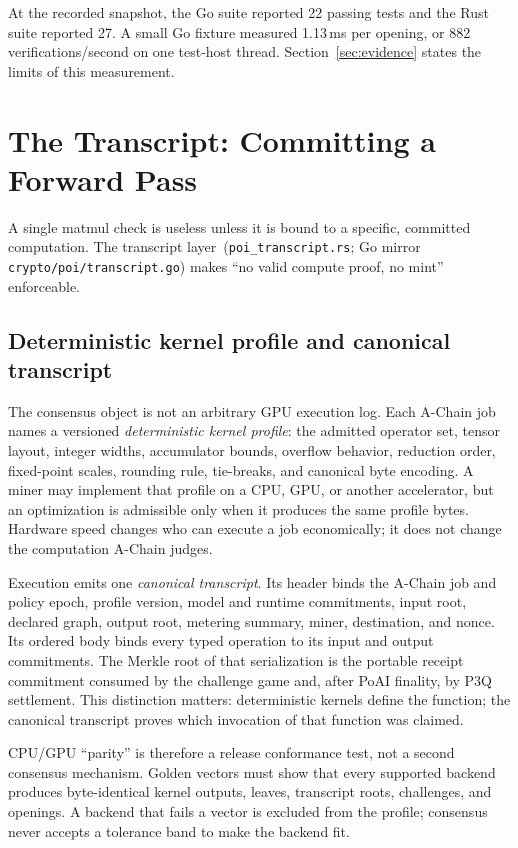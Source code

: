 \documentclass[11pt,a4paper]{article}
\begin{document}
At the recorded snapshot, the Go suite reported 22 passing tests and the Rust suite reported 27. A small Go fixture measured 1.13\,ms per opening, or 882 verifications/second on one test-host thread. Section~\ref{sec:evidence} states the limits of this measurement.

\section{The Transcript: Committing a Forward Pass}\label{sec:transcript}

A single matmul check is useless unless it is bound to a specific, committed computation. The transcript layer~(\texttt{poi\_transcript.rs}; Go mirror \texttt{crypto/poi/transcript.go}) makes ``no valid compute proof, no mint'' enforceable.

\subsection{Deterministic kernel profile and canonical transcript}

The consensus object is not an arbitrary GPU execution log.  Each A-Chain job names a
versioned \emph{deterministic kernel profile}: the admitted operator set, tensor layout,
integer widths, accumulator bounds, overflow behavior, reduction order, fixed-point
scales, rounding rule, tie-breaks, and canonical byte encoding.  A miner may implement
that profile on a CPU, GPU, or another accelerator, but an optimization is admissible only
when it produces the same profile bytes.  Hardware speed changes who can execute a job
economically; it does not change the computation A-Chain judges.

Execution emits one \emph{canonical transcript}.  Its header binds the A-Chain job and
policy epoch, profile version, model and runtime commitments, input root, declared graph,
output root, metering summary, miner, destination, and nonce.  Its ordered body binds every
typed operation to its input and output commitments.  The Merkle root of that serialization
is the portable receipt commitment consumed by the challenge game and, after PoAI finality,
by P3Q settlement.  This distinction matters: deterministic kernels define the function;
the canonical transcript proves which invocation of that function was claimed.

CPU/GPU ``parity'' is therefore a release conformance test, not a second consensus
mechanism.  Golden vectors must show that every supported backend produces byte-identical
kernel outputs, leaves, transcript roots, challenges, and openings.  A backend that fails a
vector is excluded from the profile; consensus never accepts a tolerance band to make the
backend fit.
\end{document}
